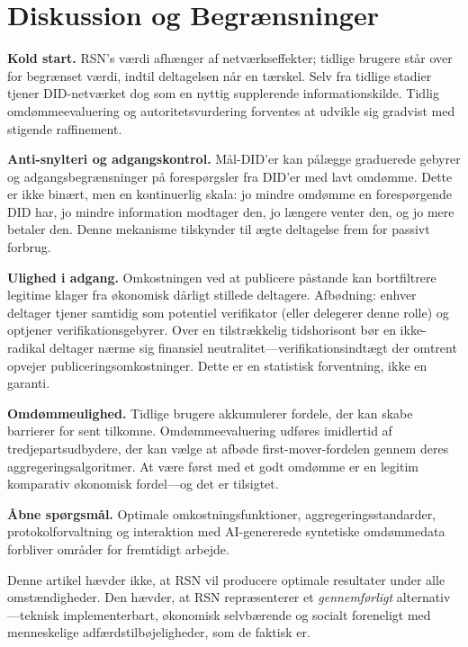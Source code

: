 \documentclass[11pt,a4paper,twocolumn]{article}
\begin{document}
\section{Diskussion og Begrænsninger}

\textbf{Kold start.} RSN's værdi afhænger af netværkseffekter; tidlige brugere står over for begrænset værdi, indtil deltagelsen når en tærskel. Selv fra tidlige stadier tjener DID-netværket dog som en nyttig supplerende informationskilde. Tidlig omdømmeevaluering og autoritetsvurdering forventes at udvikle sig gradvist med stigende raffinement.

\textbf{Anti-snylteri og adgangskontrol.} Mål-DID'er kan pålægge graduerede gebyrer og adgangsbegrænsninger på forespørgsler fra DID'er med lavt omdømme. Dette er ikke binært, men en kontinuerlig skala: jo mindre omdømme en forespørgende DID har, jo mindre information modtager den, jo længere venter den, og jo mere betaler den. Denne mekanisme tilskynder til ægte deltagelse frem for passivt forbrug.

\textbf{Ulighed i adgang.} Omkostningen ved at publicere påstande kan bortfiltrere legitime klager fra økonomisk dårligt stillede deltagere. Afbødning: enhver deltager tjener samtidig som potentiel verifikator (eller delegerer denne rolle) og optjener verifikationsgebyrer. Over en tilstrækkelig tidshorisont bør en ikke-radikal deltager nærme sig finansiel neutralitet---verifikationsindtægt der omtrent opvejer publiceringsomkostninger. Dette er en statistisk forventning, ikke en garanti.

\textbf{Omdømmeulighed.} Tidlige brugere akkumulerer fordele, der kan skabe barrierer for sent tilkomne. Omdømmeevaluering udføres imidlertid af tredjepartsudbydere, der kan vælge at afbøde first-mover-fordelen gennem deres aggregeringsalgoritmer. At være først med et godt omdømme er en legitim komparativ økonomisk fordel---og det er tilsigtet.

\textbf{Åbne spørgsmål.} Optimale omkostningsfunktioner, aggregeringsstandarder, protokolforvaltning og interaktion med AI-genererede syntetiske omdømmedata forbliver områder for fremtidigt arbejde.

Denne artikel hævder ikke, at RSN vil producere optimale resultater under alle omstændigheder. Den hævder, at RSN repræsenterer et \emph{gennemførligt} alternativ---teknisk implementerbart, økonomisk selvbærende og socialt foreneligt med menneskelige adfærdstilbøjeligheder, som de faktisk er.
\end{document}
